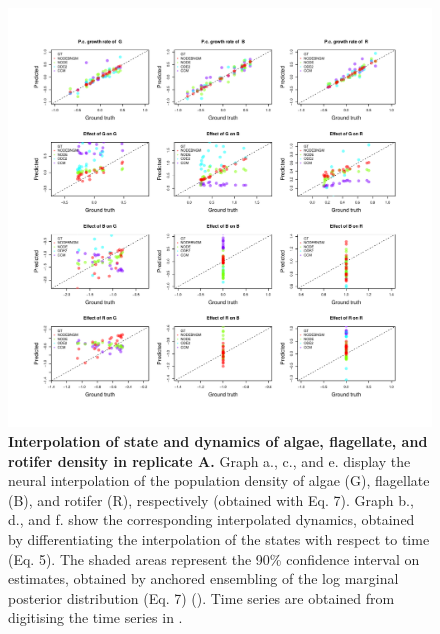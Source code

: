\documentclass[11pt, oneside]{article}
\begin{document}
\begin{figure}[H]
\includegraphics[width=1\linewidth,page=6]{figures/figures_supplementary.pdf}
\caption{
    \textbf{Interpolation of state and dynamics of algae, flagellate, and rotifer density in replicate A.}
    Graph a., c., and e. display the neural interpolation of the population density of algae (G), flagellate (B), and rotifer (R), respectively (obtained with Eq. 7). 
    Graph b., d., and f. show the corresponding interpolated dynamics, obtained by differentiating the interpolation of the states with respect to time (Eq. 5).
    The shaded areas represent the 90\% confidence interval on estimates, obtained by anchored ensembling of the log marginal posterior distribution (Eq. 7) (\cite{Pearce2018}).
    Time series are obtained from digitising the time series in \cite{Hiltunen2013}.
}
\end{figure}
\newpage
\end{document}
